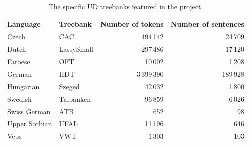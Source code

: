 \documentclass[runningheads]{template/llncs}
\begin{document}
\begin{table}
\centering
\label{tab:data}
	\begin{tabular}{llrr}
		\toprule
		\textbf{Language} & \textbf{Treebank} & \multicolumn{1}{l}{\textbf{Number of tokens}} & \multicolumn{1}{l}{\textbf{Number of sentences}} \\
		\midrule
			Czech & CAC & 494\,142 & 24\,709 \\
			Dutch & LassySmall & 297\,486 & 17\,120 \\
			Faroese & OFT & 10\,002 & 1\,208 \\
			German & HDT & 3\,399\,390 & 189\,928 \\
			Hungarian & Szeged & 42\,032 & 1\,800 \\
			Swedish & Talbanken & 96\,859 & 6\,026\\
			Swiss German & ATB & 652 & 98\\
			Upper Sorbian & UFAL & 11\,196 & 646 \\
			Veps & VWT & 1\,303 & 103 \\
		\bottomrule
	\end{tabular}
	\caption{The specific UD treebanks featured in the project.}
\end{table}
\end{document}

